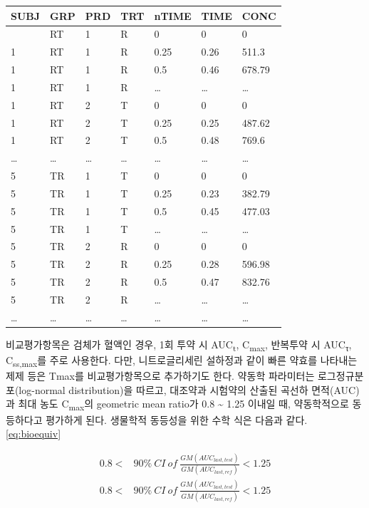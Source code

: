 \documentclass[
  11pt,
  krantz2, a4paper, twoside]{krantz}
\theoremstyle{definition}
\theoremstyle{definition}
\theoremstyle{definition}
\theoremstyle{definition}
\theoremstyle{remark}
\begin{document}
\begin{longtable}[]{@{}lllllll@{}}
\toprule\noalign{}
SUBJ & GRP & PRD & TRT & nTIME & TIME & CONC \\
\midrule\noalign{}
\endhead
\bottomrule\noalign{}
\endlastfoot
1 & RT & 1 & R & 0 & 0 & 0 \\
1 & RT & 1 & R & 0.25 & 0.26 & 511.3 \\
1 & RT & 1 & R & 0.5 & 0.46 & 678.79 \\
1 & RT & 1 & R & \ldots{} & \ldots{} & \ldots{} \\
1 & RT & 2 & T & 0 & 0 & 0 \\
1 & RT & 2 & T & 0.25 & 0.25 & 487.62 \\
1 & RT & 2 & T & 0.5 & 0.48 & 769.6 \\
\ldots{} & \ldots{} & \ldots{} & \ldots{} & \ldots{} & \ldots{} & \ldots{} \\
5 & TR & 1 & T & 0 & 0 & 0 \\
5 & TR & 1 & T & 0.25 & 0.23 & 382.79 \\
5 & TR & 1 & T & 0.5 & 0.45 & 477.03 \\
5 & TR & 1 & T & \ldots{} & \ldots{} & \ldots{} \\
5 & TR & 2 & R & 0 & 0 & 0 \\
5 & TR & 2 & R & 0.25 & 0.28 & 596.98 \\
5 & TR & 2 & R & 0.5 & 0.47 & 832.76 \\
5 & TR & 2 & R & \ldots{} & \ldots{} & \ldots{} \\
\ldots{} & \ldots{} & \ldots{} & \ldots{} & \ldots{} & \ldots{} & \ldots{} \\
\end{longtable}

비교평가항목은 검체가 혈액인 경우, 1회 투약 시 AUC\textsubscript{t}, C\textsubscript{max}, 반복투약 시 AUC\textsubscript{τ}, C\textsubscript{ss,max}를 주로 사용한다. 다만, 니트로글리세린 설하정과 같이 빠른 약효를 나타내는 제제 등은 Tmax를 비교평가항목으로 추가하기도 한다. 약동학 파라미터는 로그정규분포(log-normal distribution)을 따르고, 대조약과 시험약의 산출된 곡선하 면적(AUC)과 최대 농도 C\textsubscript{max}의 geometric mean ratio가 0.8 \textasciitilde{} 1.25 이내일 때, 약동학적으로 동등하다고 평가하게 된다.
생물학적 동등성을 위한 수학 식은 다음과 같다. \eqref{eq:bioequiv}

\begin{equation}
\begin{split}
  0.8 < & 90\%\ CI\ of\ \frac{GM(AUC_{last, test})}{GM(AUC_{last, ref})} < 1.25 \\
  0.8 < & 90\%\ CI\ of\ \frac{GM(AUC_{last, test})}{GM(AUC_{last, ref})} < 1.25 
\end{split}
\label{eq:bioequiv}
\end{equation}
\end{document}
